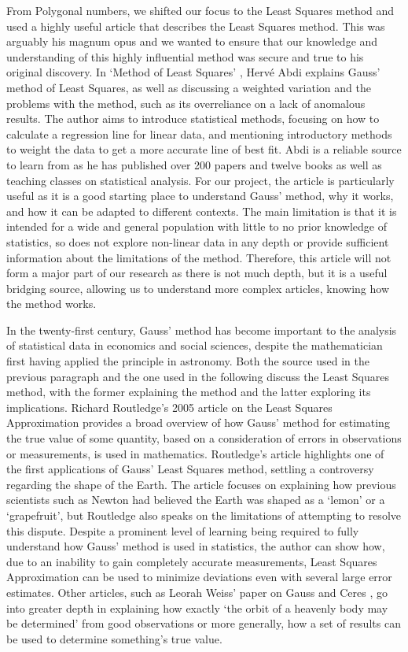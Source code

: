 \documentclass{article}
\begin{document}
From Polygonal numbers, we shifted our focus to the Least Squares method and used a highly useful article that describes the Least Squares method. This was arguably his magnum opus and we wanted to ensure that our knowledge and understanding of this highly influential method was secure and true to his original discovery. In `Method of Least Squares' \cite{abdi}, Hervé Abdi explains Gauss' method of Least Squares, as well as discussing a weighted variation and the problems with the method, such as its overreliance on a lack of anomalous results. The author aims to introduce statistical methods, focusing on how to calculate a regression line for linear data, and mentioning introductory methods to weight the data to get a more accurate line of best fit. Abdi is a reliable source to learn from as he has published over 200 papers and twelve books as well as teaching classes on statistical analysis. For our project, the article is particularly useful as it is a good starting place to understand Gauss' method, why it works, and how it can be adapted to different contexts. The main limitation is that it is intended for a wide and general population with little to no prior knowledge of statistics, so does not explore non-linear data in any depth or provide sufficient information about the limitations of the method. Therefore, this article will not form a major part of our research as there is not much depth, but it is a useful bridging source, allowing us to understand more complex articles, knowing how the method works. 

In the twenty-first century, Gauss' method has become important to the analysis of statistical data in economics and social sciences, despite the mathematician first having applied the principle in astronomy. Both the source used in the previous paragraph and the one used in the following discuss the Least Squares method, with the former explaining the method and the latter exploring its implications. Richard Routledge's 2005 article \cite{routledge} on the Least Squares Approximation provides a broad overview of how Gauss' method for estimating the true value of some quantity, based on a consideration of errors in observations or measurements, is used in mathematics. Routledge's article highlights one of the first applications of Gauss' Least Squares method, settling a controversy regarding the shape of the Earth. The article focuses on explaining how previous scientists such as Newton had believed the Earth was shaped as a `lemon' or a `grapefruit', but Routledge also speaks on the limitations of attempting to resolve this dispute. Despite a prominent level of learning being required to fully understand how Gauss' method is used in statistics, the author can show how, due to an inability to gain completely accurate measurements, Least Squares Approximation can be used to minimize deviations even with several large error estimates. Other articles, such as Leorah Weiss' paper on Gauss and Ceres \cite{historyofmaths}, go into greater depth in explaining how exactly `the orbit of a heavenly body may be determined' from good observations or more generally, how a set of results can be used to determine something's true value. 
\end{document}
